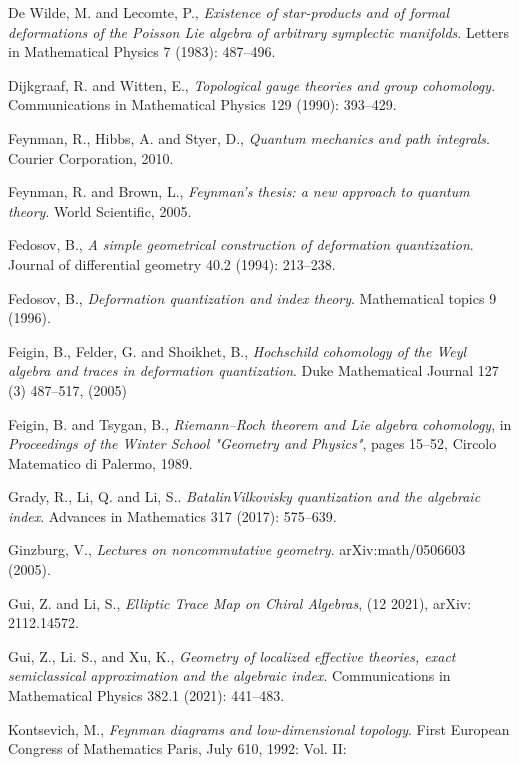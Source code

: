 \begin{enumerate}[label={[\arabic*]},leftmargin=2.8em,itemsep=0.18em,topsep=0.4em]
  \item De Wilde, M. and Lecomte, P., \textit{Existence of star-products and of
        formal deformations of the Poisson Lie algebra of arbitrary symplectic
        manifolds}. Letters in Mathematical Physics 7 (1983): 487--496.
  \item Dijkgraaf, R. and Witten, E., \textit{Topological gauge theories and group
        cohomology}. Communications in Mathematical Physics 129 (1990): 393--429.
  \item Feynman, R., Hibbs, A. and Styer, D., \textit{Quantum mechanics and path
        integrals}. Courier Corporation, 2010.
  \item Feynman, R. and Brown, L., \textit{Feynman's thesis: a new approach to
        quantum theory}. World Scientific, 2005.
  \item Fedosov, B., \textit{A simple geometrical construction of deformation
        quantization}. Journal of differential geometry 40.2 (1994): 213--238.
  \item Fedosov, B., \textit{Deformation quantization and index theory}.
        Mathematical topics 9 (1996).
  \item Feigin, B., Felder, G. and Shoikhet, B., \textit{Hochschild cohomology of the
        Weyl algebra and traces in deformation quantization}. Duke Mathematical
        Journal 127 (3) 487--517, (2005)
  \item Feigin, B. and Tsygan, B., \textit{Riemann--Roch theorem and Lie algebra
        cohomology}, in \textit{Proceedings of the Winter School "Geometry and
        Physics"}, pages 15--52, Circolo Matematico di Palermo, 1989.
  \item Grady, R., Li, Q. and Li, S.. \textit{BatalinVilkovisky quantization and the
        algebraic index}. Advances in Mathematics 317 (2017): 575--639.
  \item Ginzburg, V., \textit{Lectures on noncommutative geometry}.
        arXiv:math/0506603 (2005).
  \item Gui, Z. and Li, S., \textit{Elliptic Trace Map on Chiral Algebras},
        (12 2021), arXiv: 2112.14572.
  \item Gui, Z., Li. S., and Xu, K., \textit{Geometry of localized effective theories,
        exact semiclassical approximation and the algebraic index}. Communications
        in Mathematical Physics 382.1 (2021): 441--483.
  \item Kontsevich, M., \textit{Feynman diagrams and low-dimensional topology}.
        First European Congress of Mathematics Paris, July 610, 1992: Vol. II:

\end{enumerate}
